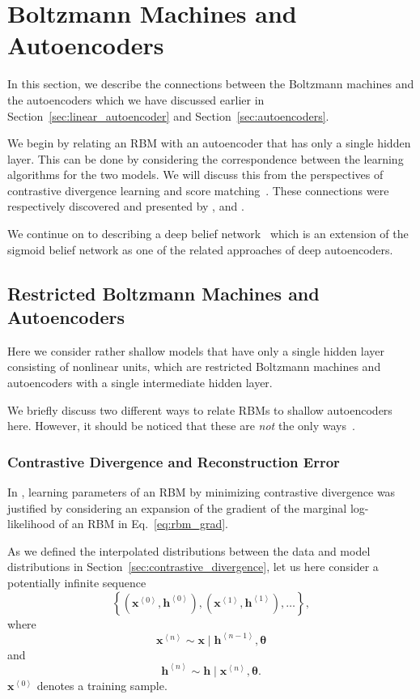 \documentclass{now}
\newcommand{\qt}[1]{\left<#1\right>}
\newcommand{\vect}[1]{\mathbf{#1}}
\newcommand{\vects}[1]{\boldsymbol{#1}}
\newcommand{\vh}[0]{\vect{h}}
\newcommand{\vx}[0]{\vect{x}}
\newcommand{\TT}[0]{{\vects{\theta}}}
\begin{document}
\section{Boltzmann Machines and Autoencoders}
\label{sec:bm_aenc}

In this section, we describe the connections between the Boltzmann machines and
the autoencoders which we have discussed earlier in
Section~\ref{sec:linear_autoencoder} and Section~\ref{sec:autoencoders}.

We begin by relating an RBM with an autoencoder that has only a single hidden
layer. This can be done by considering the correspondence between the learning
algorithms for the two models. We will discuss this from the perspectives of
contrastive divergence learning and score matching~\citep{Hyvarinen2005}. These
connections were respectively discovered and presented by \citet{Bengio2009},
\citet{Swersky2011} and \citet{Vincent2011}.

We continue on to describing a deep belief network~\citep{Hinton2006nc} which is
an extension of the sigmoid belief network as one of the related approaches of
deep autoencoders. 

\subsection{Restricted Boltzmann Machines and Autoencoders}
\label{sec:rbm_aenc}

Here we consider rather shallow models that have only a single hidden layer
consisting of nonlinear units, which are restricted Boltzmann machines and
autoencoders with a single intermediate hidden layer. 

We briefly discuss two different ways to relate RBMs to shallow autoencoders
here. However, it should be noticed that these are \textit{not} the only
ways~\citep[see, e.g.,][for another interpretation that unifies RBMs and
autoencoders]{Ranzato2007a}.

\subsubsection{Contrastive Divergence and Reconstruction Error}
\label{sec:cd_rerr}

In \citep{Bengio2009}, learning parameters of an RBM by minimizing contrastive
divergence was justified by considering an expansion of the gradient of the
marginal log-likelihood of an RBM in Eq.~\eqref{eq:rbm_grad}. 

As we defined the interpolated distributions between the data and model
distributions in Section~\ref{sec:contrastive_divergence}, let us here consider
a potentially infinite sequence 
\[
    \left\{
\left(\vx^{\qt{0}}, \vh^{\qt{0}}\right),
\left(\vx^{\qt{1}},
\vh^{\qt{1}}\right), \dots \right\},
\]
where
\[
\vx^{\qt{n}} \sim \vx \mid \vh^{\qt{n-1}}, \TT
\]
and
\[
\vh^{\qt{n}} \sim \vh \mid \vx^{\qt{n}}, \TT.
\]
$\vx^{\qt{0}}$ denotes a training sample.
\end{document}
